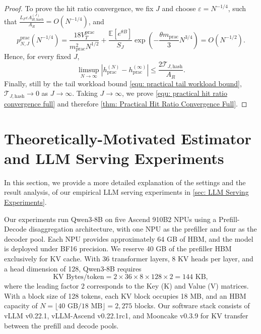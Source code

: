 \documentclass{article}
\theoremstyle{definition}
\newcommand{\E}{\mathbb E}
\begin{document}
\begin{proof}
To prove the hit ratio convergence, we fix $J$ and choose $\varepsilon=N^{-1/4}$, such that $\frac{L_F\varepsilon A_{H,\mathrm{hash}}^{(J)}}{A_R}=O(N^{-1/4})$, and 
\begin{equation*}
    p_{N,J}^{\mathrm{prac}}(N^{-1/4}) = \frac{18V_T^{\mathrm{prac}}}{m_{\mathrm{prac}}^2N^{1/2}} + \frac{\E[e^{\theta B}]}{S_J}\exp\left(-\frac{\theta m_{\mathrm{prac}}}{3}N^{3/4}\right) =O(N^{-1/2}).
\end{equation*}
Hence, for every fixed $J$,
\begin{equation*}
    \limsup_{N\rightarrow\infty} \left|h_{ \mathrm{prac}}^{(N)}-h_{ \mathrm{prac}}^{(\infty)}\right| \leq \frac{2\mathcal T_{J,\mathrm{hash}}}{A_R}.
\end{equation*}
Finally, still by the tail workload bound \eqref{equ: practical tail workload bound}, $\mathcal T_{J,\mathrm{hash}}\rightarrow 0$ as $J\rightarrow\infty$. Taking $J\rightarrow\infty$, we prove \eqref{equ: practical hit ratio convergence full} and therefore \cref{thm: Practical Hit Ratio Convergence Full}.
\end{proof}

\section{Theoretically-Motivated Estimator and LLM Serving Experiments}
\label{sec: LLM-Inference Experiment and Empirical Results}

In this section, we provide a more detailed explanation of the settings and the result analysis, of our empirical LLM serving experiments in \cref{sec: LLM Serving Experiments}. 

Our experiments run Qwen3-8B on five Ascend 910B2 NPUs using a Prefill-Decode disaggregation architecture, with one NPU as the prefiller and four as the decoder pool. Each NPU provides approximately 64 GB of HBM, and the model is deployed under BF16 precision. We reserve 40 GB of the prefiller HBM exclusively for KV cache. With 36 transformer layers, 8 KV heads per layer, and a head dimension of 128, Qwen3-8B requires
\begin{equation*}
    \text{KV Bytes/token}=2\times36\times8\times128\times2=144\text{ KB},
\end{equation*}
where the leading factor $2$ corresponds to the Key (K) and Value (V) matrices. With a block size of 128 tokens, each KV block occupies 18 MB, and an HBM capacity of $N=\lfloor40\text{ GB}/18\text{ MB}\rfloor=2{,}275$ blocks. Our software stack consists of vLLM v0.22.1, vLLM-Ascend v0.22.1rc1, and Mooncake v0.3.9 for KV transfer between the prefill and decode pools.
\end{document}
